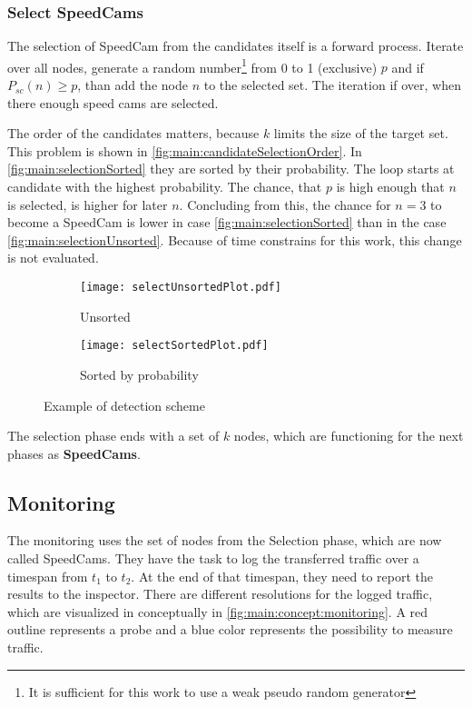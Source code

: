 \documentclass[thesis.tex]{subfiles}
\begin{document}
\subsubsection{Select SpeedCams} \label{sec:main:selectionPhase:selecting}

The selection of SpeedCam from the candidates itself is a forward process. Iterate over all nodes, generate a random number\footnote{It is sufficient for this work to use a weak pseudo random generator} from 0 to 1 (exclusive) $p$ and if $P_{sc}(n) \geq p$, than add the node $n$ to the selected set. The iteration if over, when there enough speed cams are selected.

The order of the candidates matters, because $k$ limits the size of the target set. This problem is shown in \autoref{fig:main:candidateSelectionOrder}. In \autoref{fig:main:selectionSorted} they are sorted by their probability. The loop starts at candidate with the highest probability. The chance, that $p$ is high enough that $n$ is selected, is higher for later $n$. Concluding from this, the chance for $n=3$ to become a SpeedCam is lower in case \autoref{fig:main:selectionSorted} than in the case \autoref{fig:main:selectionUnsorted}. Because of time constrains for this work, this change is not evaluated.
\begin{figure}[h]
    \begin{subfigure}{.45\linewidth}
        \centering
        \texttt{[image: selectUnsortedPlot.pdf]}
        \caption{Unsorted}
        \label{fig:main:selectionUnsorted}
    \end{subfigure}%
    \begin{subfigure}{0.45\linewidth}
        \centering
        \texttt{[image: selectSortedPlot.pdf]}
        \caption{Sorted by probability}
        \label{fig:main:selectionSorted}
    \end{subfigure}
    \caption{Example of detection scheme}
    \label{fig:main:candidateSelectionOrder}
\end{figure}

The selection phase ends with a set of $k$ nodes, which are functioning for the next phases as \textbf{SpeedCams}.

\subsection{Monitoring} \label{sec:main:monitoringphase}
The monitoring uses the set of nodes from the Selection phase, which are now called SpeedCams. They have the task to log the transferred traffic over a timespan from $t_1$ to $t_2$. At the end of that timespan, they need to report the results to the inspector. There are different resolutions for the logged traffic, which are visualized in conceptually in \autoref{fig:main:concept:monitoring}. A red outline represents a probe and a blue color represents the possibility to measure traffic.
\end{document}

